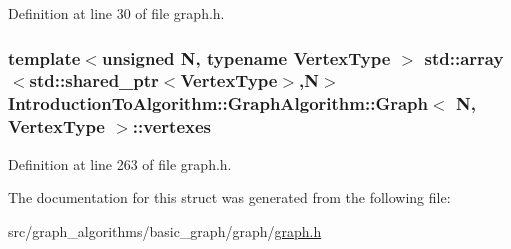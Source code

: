 Definition at line 30 of file graph.\+h.

\hypertarget{struct_introduction_to_algorithm_1_1_graph_algorithm_1_1_graph_a72c79fda857c79493d145acb18e64924}{}
\subsubsection[{vertexes}]{\setlength{\rightskip}{0pt plus 5cm}template$<$unsigned N, typename Vertex\+Type $>$ std\+::array$<$std\+::shared\+\_\+ptr$<$Vertex\+Type$>$,N$>$ {\bf Introduction\+To\+Algorithm\+::\+Graph\+Algorithm\+::\+Graph}$<$ N, Vertex\+Type $>$\+::vertexes}\label{struct_introduction_to_algorithm_1_1_graph_algorithm_1_1_graph_a72c79fda857c79493d145acb18e64924}


Definition at line 263 of file graph.\+h.



The documentation for this struct was generated from the following file\+:\begin{DoxyCompactItemize}
\item 
src/graph\+\_\+algorithms/basic\+\_\+graph/graph/\hyperlink{graph_8h}{graph.\+h}\end{DoxyCompactItemize}
